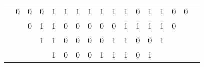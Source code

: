 \documentclass{article}
\newcommand{\tableCA}[3]{
  \py{rule(#1, #2, "#3")}
}
\begin{document}
\begin{tabular}{ c c c c c c c c c c c c c c c c c }
  & 0 & 0 & 0 & 1 & 1 & 1 & 1 & 1 & 1 & 1 & 0 & 1 & 1 & 0 & 0 &  \\
  &   & 0 & 1 & 1 & 0 & 0 & 0 & 0 & 0 & 1 & 1 & 1 & 1 & 0 &   &  \\
  &   &   & 1 & 1 & 0 & 0 & 0 & 0 & 1 & 1 & 0 & 0 & 1 &   &   &  \\
  &   &   &   & 1 & 0 & 0 & 0 & 1 & 1 & 1 & 0 & 1 &   &   &   &  \\
\end{tabular}
\end{document}

